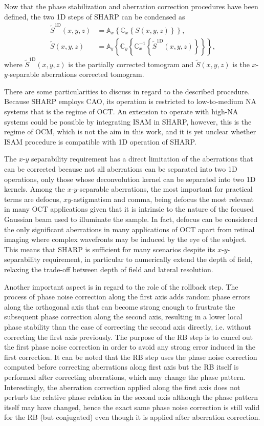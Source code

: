 Now that the phase stabilization and aberration correction procedures have been defined, the two 1D steps of SHARP can be condensed as
\begin{align}\label{eq:SHARP}
    \tilde{S}^{\text{1D}}(x,y,z) &= \mathbb{A}_x\left\{ \mathbb{C}_x\left\{ S(x,y,z) \right\} \right\}, \\
    \tilde{S}(x,y,z) &= \mathbb{A}_y\left\{ \mathbb{C}_y\left\{ \mathbb{C}^{-1}_x\left\{  \tilde{S}^{\text{1D}}(x,y,z) \right\} \right\} \right\},
\end{align}
where $\tilde{S}^{\text{1D}}(x,y,z)$ is the partially corrected tomogram and $\tilde{S}(x,y,z)$ is the $x$-$y$-separable aberrations corrected tomogram.

There are some particularities to discuss in regard to the described procedure. Because SHARP employs CAO, its operation is restricted to low-to-medium NA systems that is the regime of OCT. An extension to operate with high-NA systems could be possible by integrating ISAM in SHARP, however, this is the regime of OCM, which is not the aim in this work, and it is yet unclear whether ISAM procedure is compatible with 1D operation of SHARP.

The $x$-$y$ separability requirement has a direct limitation of the aberrations that can be corrected because not all aberrations can be separated into two 1D operations, only those whose deconvolution kernel can be separated into two 1D kernels. Among the $x$-$y$-separable aberrations, the most important for practical terms are defocus, $xy$-astigmatism and comma, being defocus the most relevant in many OCT applications given that it is intrinsic to the nature of the focused Gaussian beam used to illuminate the sample. In fact, defocus can be considered the only significant aberrations in many applications of OCT apart from retinal imaging where complex wavefronts may be induced by the eye of the subject. This means that SHARP is sufficient for many scenarios despite its $x$-$y$-separability requirement, in particular to numerically extend the depth of field, relaxing the trade-off between depth of field and lateral resolution.

Another important aspect is in regard to the role of the rollback step. The process of phase noise correction along the first axis adds random phase errors along the orthogonal axis that can become strong enough to frustrate the subsequent phase correction along the second axis, resulting in a lower local phase stability than the case of correcting the second axis directly, i.e. without correcting the first axis previously. The purpose of the RB step is to cancel out the first phase noise correction in order to avoid any strong error induced in the first correction. It can be noted that the RB step uses the phase noise correction computed before correcting aberrations along first axis but the RB itself is performed after correcting aberrations, which may change the phase pattern. Interestingly, the aberration correction applied along the first axis does not perturb the relative phase relation in the second axis although the phase pattern itself may have changed, hence the exact same phase noise correction is still valid for the RB (but conjugated) even though it is applied after aberration correction.

